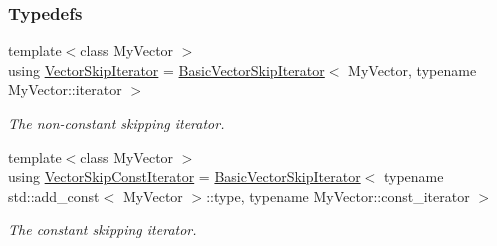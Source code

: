 \subsubsection*{Typedefs}
\begin{DoxyCompactItemize}
\item 
{\footnotesize template$<$class My\+Vector $>$ }\\using \hyperlink{namespaceslb_1_1core_1_1util_a52016fe00a4fae8791643b870848a79f}{Vector\+Skip\+Iterator} = \hyperlink{structslb_1_1core_1_1util_1_1BasicVectorSkipIterator}{Basic\+Vector\+Skip\+Iterator}$<$ My\+Vector, typename My\+Vector\+::iterator $>$
\begin{DoxyCompactList}\small\item\em The non-\/constant skipping iterator. \end{DoxyCompactList}\item 
{\footnotesize template$<$class My\+Vector $>$ }\\using \hyperlink{namespaceslb_1_1core_1_1util_a5692b540118495a35ebae95fb8b80790}{Vector\+Skip\+Const\+Iterator} = \hyperlink{structslb_1_1core_1_1util_1_1BasicVectorSkipIterator}{Basic\+Vector\+Skip\+Iterator}$<$ typename std\+::add\+\_\+const$<$ My\+Vector $>$\+::type, typename My\+Vector\+::const\+\_\+iterator $>$
\begin{DoxyCompactList}\small\item\em The constant skipping iterator. \end{DoxyCompactList}\end{DoxyCompactItemize}
